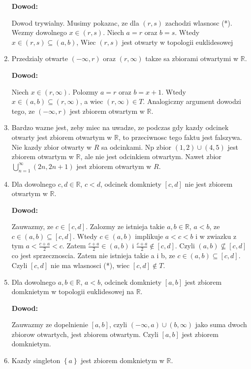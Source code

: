 \documentclass{article}
\begin{document}
\begin{enumerate}[label=(\alph*)]
        \textbf{Dowod:}
        
        Dowod trywialny. Musimy pokazac, ze dla $(r,s)$ zachodzi wlasnosc (*). Wezmy dowolnego $x \in (r,s)$. Niech $a=r$ oraz $b=s$. Wtedy $x \in (r,s) \subseteq (a,b)$, Wiec $(r,s)$ jest otwarty w topologii euklidesowej
    \item Przedzialy otwarte $(-\infty, r)$ oraz $(r, \infty)$ takze sa zbiorami otwartymi w $\mathbb{R}$.

        \textbf{Dowod:}

        Niech $x \in (r,\infty)$. Polozmy $a = r$ oraz $b = x+1$. Wtedy $x \in (a,b) \subseteq (r, \infty)$, a wiec $(r, \infty) \in T$. Analogiczny argument dowodzi tego, ze $(-\infty, r)$ jest zbiorem otwartym w $\mathbb{R}$.
    \item Bardzo wazne jest, zeby miec na uwadze, ze podczas gdy kazdy odcinek otwarty jest zbiorem otwartym w $\mathbb{R}$, to przeciwnosc tego faktu jest falszywa. Nie kazdy zbior otwarty w $R$ sa odcinkami. Np zbior $(1,2) \cup (4, 5)$ jest zbiorem otwartym w $\mathbb{R}$, ale nie jest odcinkiem otwartym. Nawet zbior $\bigcup\limits_{n=1}^{\infty}(2n, 2n+1)$ jest zbiorem otwartym w $R$.

    \item Dla dowolnego $c,d \in \mathbb{R}$, $c<d$, odcinek domkniety $[c,d]$ nie jest zbiorem otwartym w $\mathbb{R}$.

        \textbf{Dowod:}

        Zauwazmy, ze $c \in [c,d]$. Zalozmy ze istnieja takie $a,b \in \mathbb{R}$, $a<b$, ze $c \in (a,b) \subseteq [c,d]$. Wtedy $c \in (a,b)$ implikuje $a < c < b$ i w zwiazku z tym $a < \frac{c+a}{2} < c$. Zatem $  \frac{c+a}{2} \in (a,b)$ i $ \frac{c+a}{2} \notin [c,d]$. Czyli $(a,b) \not\subseteq [c,d]$ co jest sprzecznoscia. Zatem nie istnieja takie a i b, ze $c \in (a,b) \subseteq [c,d]$. Czyli $[c,d]$ nie ma wlasnosci (*), wiec $[c,d] \notin T$.
    \item  Dla dowolnego $a,b \in \mathbb{R}$, $a<b$, odcinek domkniety $[a,b]$ jest zbiorem domknietym w topologii euklidesowej na $\mathbb{R}$.

        \textbf{Dowod:}

        Zauwazmy ze dopelnienie $[a,b]$, czyli $(-\infty, a) \cup (b, \infty)$ jako suma dwoch zbiorow otwartych, jest zbiorem otwartym. Czyli $[a,b]$ jest zbiorem domknietym.

    \item Kazdy singleton $\left\{ a \right\}$ jest zbiorem domknietym w $\mathbb{R}$.


\end{enumerate}
\end{document}
